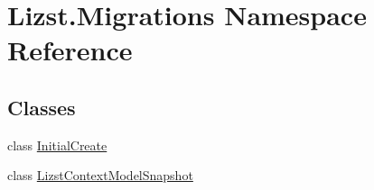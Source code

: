 \hypertarget{namespace_lizst_1_1_migrations}{}\section{Lizst.\+Migrations Namespace Reference}
\label{namespace_lizst_1_1_migrations}
\subsection*{Classes}
\begin{DoxyCompactItemize}
\item 
class \mbox{\hyperlink{class_lizst_1_1_migrations_1_1_initial_create}{Initial\+Create}}
\item 
class \mbox{\hyperlink{class_lizst_1_1_migrations_1_1_lizst_context_model_snapshot}{Lizst\+Context\+Model\+Snapshot}}
\end{DoxyCompactItemize}
